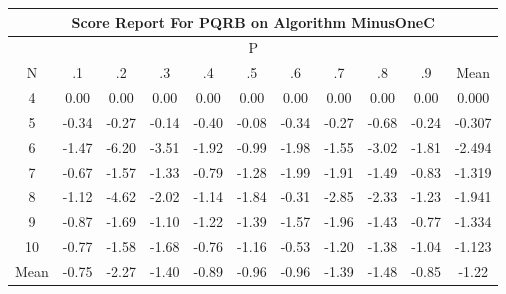 \documentclass[11pt,a4paper]{report}
\begin{document}
\begin{longtable}{ | c || c | c | c | c | c | c | c | c | c || c |}
\hline
\multicolumn{11}{|c|}{ Score Report For PQRB on Algorithm MinusOneC} \\
\hline
\multicolumn{11}{|c|}{ P } \\
\hline
N & .1 & .2 & .3 & .4 & .5 & .6 & .7 & .8 & .9 & Mean\\
 \hline
 \hline
 \endhead
  4 &  \cellcolor[HTML]{FFFFFF} 0.00 &  \cellcolor[HTML]{FFFFFF} 0.00 &  \cellcolor[HTML]{FFFFFF} 0.00 &  \cellcolor[HTML]{FFFFFF} 0.00 &  \cellcolor[HTML]{FFFFFF} 0.00 &  \cellcolor[HTML]{FFFFFF} 0.00 &  \cellcolor[HTML]{FFFFFF} 0.00 &  \cellcolor[HTML]{FFFFFF} 0.00 &  \cellcolor[HTML]{FFFFFF} 0.00 & 0.000 \\
  5 &  \cellcolor[HTML]{FFF7F7} -0.34 &  \cellcolor[HTML]{FFF7F7} -0.27 &  \cellcolor[HTML]{FFFFFF} -0.14 &  \cellcolor[HTML]{FFF7F7} -0.40 &  \cellcolor[HTML]{FFFFFF} -0.08 &  \cellcolor[HTML]{FFF7F7} -0.34 &  \cellcolor[HTML]{FFF7F7} -0.27 &  \cellcolor[HTML]{FFEFEF} -0.68 &  \cellcolor[HTML]{FFF7F7} -0.24 & -0.307 \\
  6 &  \cellcolor[HTML]{FFD7D7} -1.47 &  \cellcolor[HTML]{FF6060} -6.20 &  \cellcolor[HTML]{FFA7A7} -3.51 &  \cellcolor[HTML]{FFCFCF} -1.92 &  \cellcolor[HTML]{FFE7E7} -0.99 &  \cellcolor[HTML]{FFCFCF} -1.98 &  \cellcolor[HTML]{FFD7D7} -1.55 &  \cellcolor[HTML]{FFAFAF} -3.02 &  \cellcolor[HTML]{FFCFCF} -1.81 & -2.494 \\
  7 &  \cellcolor[HTML]{FFEFEF} -0.67 &  \cellcolor[HTML]{FFD7D7} -1.57 &  \cellcolor[HTML]{FFDFDF} -1.33 &  \cellcolor[HTML]{FFE7E7} -0.79 &  \cellcolor[HTML]{FFDFDF} -1.28 &  \cellcolor[HTML]{FFCFCF} -1.99 &  \cellcolor[HTML]{FFCFCF} -1.91 &  \cellcolor[HTML]{FFD7D7} -1.49 &  \cellcolor[HTML]{FFE7E7} -0.83 & -1.319 \\
  8 &  \cellcolor[HTML]{FFDFDF} -1.12 &  \cellcolor[HTML]{FF8787} -4.62 &  \cellcolor[HTML]{FFCFCF} -2.02 &  \cellcolor[HTML]{FFDFDF} -1.14 &  \cellcolor[HTML]{FFCFCF} -1.84 &  \cellcolor[HTML]{FFF7F7} -0.31 &  \cellcolor[HTML]{FFB7B7} -2.85 &  \cellcolor[HTML]{FFC7C7} -2.33 &  \cellcolor[HTML]{FFDFDF} -1.23 & -1.941 \\
  9 &  \cellcolor[HTML]{FFE7E7} -0.87 &  \cellcolor[HTML]{FFD7D7} -1.69 &  \cellcolor[HTML]{FFE7E7} -1.10 &  \cellcolor[HTML]{FFDFDF} -1.22 &  \cellcolor[HTML]{FFDFDF} -1.39 &  \cellcolor[HTML]{FFD7D7} -1.57 &  \cellcolor[HTML]{FFCFCF} -1.96 &  \cellcolor[HTML]{FFD7D7} -1.43 &  \cellcolor[HTML]{FFEFEF} -0.77 & -1.334 \\
  10 &  \cellcolor[HTML]{FFEFEF} -0.77 &  \cellcolor[HTML]{FFD7D7} -1.58 &  \cellcolor[HTML]{FFD7D7} -1.68 &  \cellcolor[HTML]{FFEFEF} -0.76 &  \cellcolor[HTML]{FFDFDF} -1.16 &  \cellcolor[HTML]{FFEFEF} -0.53 &  \cellcolor[HTML]{FFDFDF} -1.20 &  \cellcolor[HTML]{FFDFDF} -1.38 &  \cellcolor[HTML]{FFE7E7} -1.04 & -1.123 \\
 \hline
 \hline
Mean &  \cellcolor[HTML]{FFEFEF} -0.75 &  \cellcolor[HTML]{FFC7C7} -2.27 &  \cellcolor[HTML]{FFDFDF} -1.40 &  \cellcolor[HTML]{FFE7E7} -0.89 &  \cellcolor[HTML]{FFE7E7} -0.96 &  \cellcolor[HTML]{FFE7E7} -0.96 &  \cellcolor[HTML]{FFDFDF} -1.39 &  \cellcolor[HTML]{FFD7D7} -1.48 &  \cellcolor[HTML]{FFE7E7} -0.85 &  \cellcolor[HTML]{FFDFDF} -1.22
\end{longtable}
\end{document}
